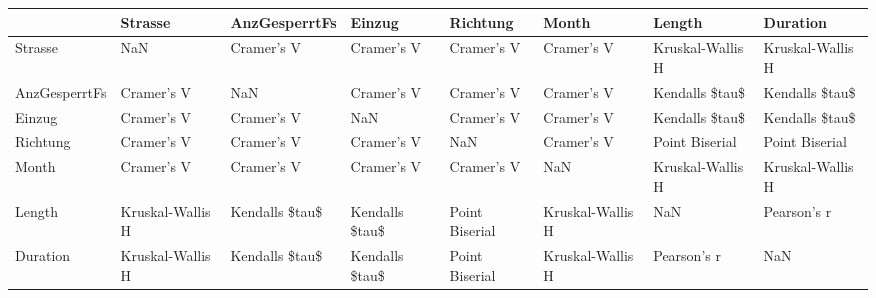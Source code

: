 \begin{tabular}{llllllll}
\toprule
{} &           Strasse &   AnzGesperrtFs &          Einzug &        Richtung &             Month &            Length &          Duration \\
\midrule
Strasse       &               NaN &      Cramer's V &      Cramer's V &      Cramer's V &        Cramer's V &  Kruskal-Wallis H &  Kruskal-Wallis H \\
AnzGesperrtFs &        Cramer's V &             NaN &      Cramer's V &      Cramer's V &        Cramer's V &    Kendalls \$tau\$ &    Kendalls \$tau\$ \\
Einzug        &        Cramer's V &      Cramer's V &             NaN &      Cramer's V &        Cramer's V &    Kendalls \$tau\$ &    Kendalls \$tau\$ \\
Richtung      &        Cramer's V &      Cramer's V &      Cramer's V &             NaN &        Cramer's V &    Point Biserial &    Point Biserial \\
Month         &        Cramer's V &      Cramer's V &      Cramer's V &      Cramer's V &               NaN &  Kruskal-Wallis H &  Kruskal-Wallis H \\
Length        &  Kruskal-Wallis H &  Kendalls \$tau\$ &  Kendalls \$tau\$ &  Point Biserial &  Kruskal-Wallis H &               NaN &       Pearson's r \\
Duration      &  Kruskal-Wallis H &  Kendalls \$tau\$ &  Kendalls \$tau\$ &  Point Biserial &  Kruskal-Wallis H &       Pearson's r &               NaN \\
\bottomrule
\end{tabular}
